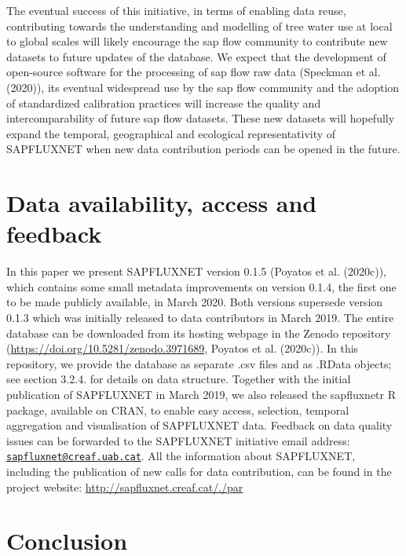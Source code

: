 \documentclass[11pt,twoside]{reedthesis}
\begin{document}
The eventual success of this initiative, in terms of enabling data
reuse, contributing towards the understanding and modelling of tree
water use at local to global scales will likely encourage the sap flow
community to contribute new datasets to future updates of the database.
We expect that the development of open-source software for the
processing of sap flow raw data (Speckman et al. (2020)), its eventual
widespread use by the sap flow community and the adoption of
standardized calibration practices will increase the quality and
intercomparability of future sap flow datasets. These new datasets will
hopefully expand the temporal, geographical and ecological
representativity of SAPFLUXNET when new data contribution periods can be
opened in the future.\par

\section{Data availability, access and
feedback}\label{data-availability-access-and-feedback}

In this paper we present SAPFLUXNET version 0.1.5 (Poyatos et al.
(2020c)), which contains some small metadata improvements on version
0.1.4, the first one to be made publicly available, in March 2020. Both
versions supersede version 0.1.3 which was initially released to data
contributors in March 2019. The entire database can be downloaded from
its hosting webpage in the Zenodo repository
(\url{https://doi.org/10.5281/zenodo.3971689}, Poyatos et al. (2020c)).
In this repository, we provide the database as separate .csv files and
as .RData objects; see section 3.2.4. for details on data structure.
Together with the initial publication of SAPFLUXNET in March 2019, we
also released the sapfluxnetr R package, available on CRAN, to enable
easy access, selection, temporal aggregation and visualisation of
SAPFLUXNET data. Feedback on data quality issues can be forwarded to the
SAPFLUXNET initiative email address:
\href{mailto:sapfluxnet@creaf.uab.cat}{\nolinkurl{sapfluxnet@creaf.uab.cat}}.
All the information about SAPFLUXNET, including the publication of new
calls for data contribution, can be found in the project website:
\url{http://sapfluxnet.creaf.cat/./par}

\section{Conclusion}\label{conclusion}
\end{document}
